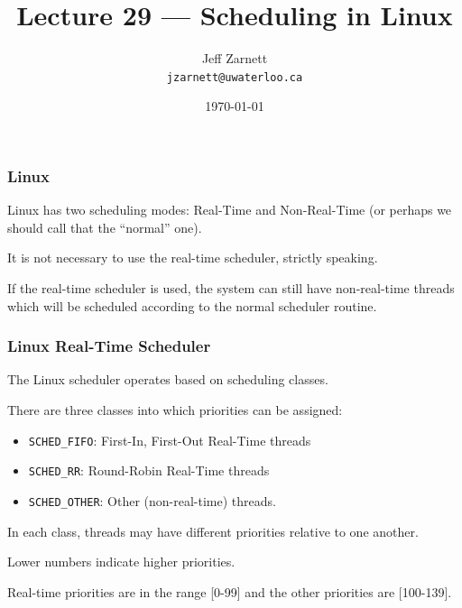

\title{Lecture 29 --- Scheduling in Linux }

\author{Jeff Zarnett \\ \small \texttt{jzarnett@uwaterloo.ca}}
\date{\today}




\begin{frame}
  \titlepage

 \end{frame}
 
 
\begin{frame}
\frametitle{Linux}

Linux has two scheduling modes: Real-Time and Non-Real-Time (or perhaps we should call that the ``normal'' one). 

It is not necessary to use the real-time scheduler, strictly speaking. 

If the real-time scheduler is used, the system can still have non-real-time threads which will be scheduled according to the normal scheduler routine.

\end{frame}

\begin{frame}
\frametitle{Linux Real-Time Scheduler}

The Linux scheduler operates based on \alert{scheduling classes}.

There are three classes into which priorities can be assigned:

\begin{itemize}
	\item \texttt{SCHED\_FIFO}: First-In, First-Out Real-Time threads
	\item \texttt{SCHED\_RR}: Round-Robin Real-Time threads
	\item \texttt{SCHED\_OTHER}: Other (non-real-time) threads.
\end{itemize}


In each class, threads may have different priorities relative to one another. 

Lower numbers indicate higher priorities. 

Real-time priorities are in the range [0-99] and the other priorities are [100-139].

\end{frame}

